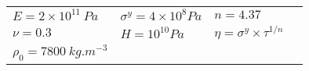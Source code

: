   \begin{tabular}{l|l|lN}
    \hline
    $E=2\times 10^{11}\:Pa$ & $\sigma^y=4 \times 10^8 Pa$ & $n=4.37$&  \\ [3pt]
    $\nu=0.3$ & $H=10^{10} Pa$ & $\eta=\sigma^y \times \tau^{1/n} $ & \\[3pt]
    $\rho_0 = 7800 \: kg.m^{-3}$ & & &\\[3pt]
    \hline
  \end{tabular}

